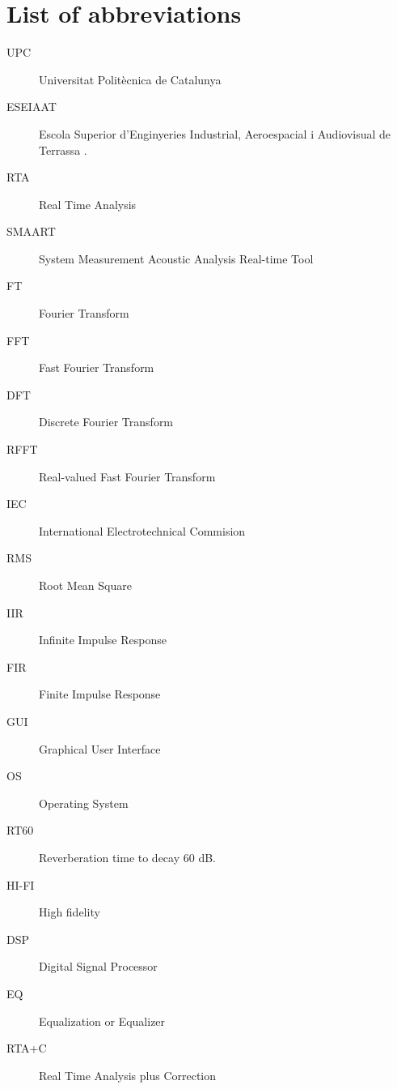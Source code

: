 \chapter*{List of abbreviations}

\begin{description}
	\item[UPC] Universitat Politècnica de Catalunya
	\item[ESEIAAT] Escola Superior d’Enginyeries Industrial, Aeroespacial i Audiovisual de Terrassa \cite{eseiaat}.
	\item[RTA] Real Time Analysis
	\item[SMAART] System Measurement Acoustic Analysis Real-time Tool
	\item[FT] Fourier Transform
	\item[FFT] Fast Fourier Transform
	\item[DFT] Discrete Fourier Transform
	\item[RFFT] Real-valued Fast Fourier Transform
	\item[IEC] International Electrotechnical Commision
	\item[RMS] Root Mean Square
	\item[IIR] Infinite Impulse Response
	\item[FIR] Finite Impulse Response
	\item[GUI] Graphical User Interface
	\item[OS] Operating System
	\item[RT60] Reverberation time to decay 60 dB.
	\item[HI-FI] High fidelity
	\item[DSP] Digital Signal Processor
	\item[EQ] Equalization or Equalizer
	\item[RTA+C] Real Time Analysis plus Correction

\end{description}